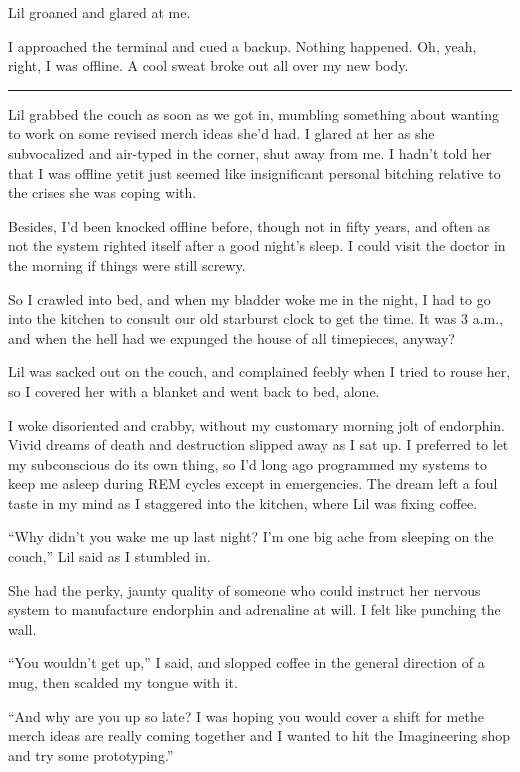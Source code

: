 Lil groaned and glared at me.

I approached the terminal and cued a backup. Nothing happened. Oh,
yeah, right, I was offline. A cool sweat broke out all over my new
body.

\begin{center}\rule{1in}{0.4pt}\end{center}

Lil grabbed the couch as soon as we got in, mumbling something
about wanting to work on some revised merch ideas she'd had. I
glared at her as she subvocalized and air-typed in the corner, shut
away from me. I hadn't told her that I was offline yet{\dash}it just
seemed like insignificant personal bitching relative to the crises
she was coping with.

Besides, I'd been knocked offline before, though not in fifty
years, and often as not the system righted itself after a good
night's sleep. I could visit the doctor in the morning if things
were still screwy.

So I crawled into bed, and when my bladder woke me in the night, I
had to go into the kitchen to consult our old starburst clock to
get the time. It was 3 a.m., and when the hell had we expunged the
house of all timepieces, anyway?

Lil was sacked out on the couch, and complained feebly when I tried
to rouse her, so I covered her with a blanket and went back to bed,
alone.

I woke disoriented and crabby, without my customary morning jolt of
endorphin. Vivid dreams of death and destruction slipped away as I
sat up. I preferred to let my subconscious do its own thing, so I'd
long ago programmed my systems to keep me asleep during REM cycles
except in emergencies. The dream left a foul taste in my mind as I
staggered into the kitchen, where Lil was fixing coffee.

“Why didn't you wake me up last night? I'm one big ache from
sleeping on the couch,” Lil said as I stumbled in.

She had the perky, jaunty quality of someone who could instruct her
nervous system to manufacture endorphin and adrenaline at will. I
felt like punching the wall.

“You wouldn't get up,” I said, and slopped coffee in the general
direction of a mug, then scalded my tongue with it.

“And why are you up so late? I was hoping you would cover a shift
for me{\dash}the merch ideas are really coming together and I wanted to
hit the Imagineering shop and try some prototyping.”

